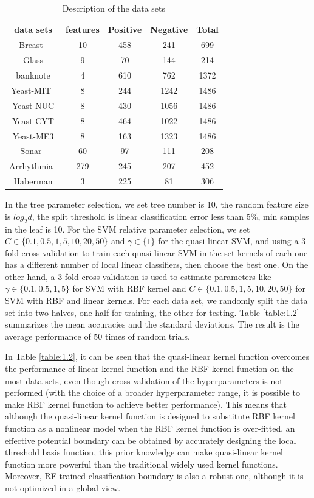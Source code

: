 \documentclass[master]{IPSstyle}
\begin{document}
{\begin{table}[H]
\renewcommand\arraystretch{1.2}
\centering \caption{Description of the data sets\label{table:1.1}}
\begin{tabular}{c|c|c|c|c}
\hline
data sets & features & Positive & Negative & Total \\
 \hline\hline
Breast~\cite{wolberg1990multisurface} & 10 & 458 & 241 & 699 \\
Glass & 9 & 70 & 144 & 214 \\
banknote & 4 & 610 & 762 & 1372 \\
Yeast-MIT~\cite{horton1996probabilistic} & 8 & 244 & 1242 & 1486 \\
Yeast-NUC & 8 & 430 & 1056 & 1486 \\
Yeast-CYT & 8 & 464 & 1022 & 1486 \\
Yeast-ME3 & 8 & 163 & 1323 & 1486 \\
Sonar~\cite{gorman1988analysis} & 60 & 97 & 111 & 208 \\
Arrhythmia~\cite{guvenir1997supervised} & 279 & 245 & 207 & 452 \\
Haberman & 3 & 225 & 81 & 306 \\
\hline
\end{tabular}
\end{table}

In the tree parameter selection, we set tree number is 10, the random feature size is $log_2d$, the split threshold is linear classification error less than 5\%,  min samples in the leaf is 10. For the SVM relative parameter selection, we set $C\in\{0.1,0.5,1,5,10,20,50\}$ and $\gamma\in\{1\}$ for the quasi-linear SVM, and using a 3-fold cross-validation to train each quasi-linear SVM in the set kernels of each one has a different number of local linear classifiers, then choose the best one. On the other hand, a 3-fold cross-validation is used to estimate parameters like $\gamma\in\{0.1,0.5,1,5\}$ for SVM with RBF kernel and $C\in\{0.1,0.5,1,5,10,20,50\}$ for SVM with RBF and linear kernels. For each data set, we randomly split the data set into two halves, one-half for training, the other for testing. Table \ref{table:1.2} summarizes the mean accuracies and the standard deviations. The result is the average performance of 50 times of random trials. 

In Table \ref{table:1.2}, it can be seen that the quasi-linear kernel function overcomes the performance of linear kernel function and the RBF kernel function on the most data sets, even though cross-validation of the hyperparameters is not performed (with the choice of a broader hyperparameter range, it is possible to make RBF kernel function to achieve better performance). This means that although the quasi-linear kernel function is designed to substitute RBF kernel function as a nonlinear model when the RBF kernel function is over-fitted, an effective potential boundary can be obtained by accurately designing the local threshold basis function, this prior knowledge can make quasi-linear kernel function more powerful than the traditional widely used kernel functions. Moreover, RF trained classification boundary is also a robust one, although it is not optimized in a global view.

}
\end{document}

